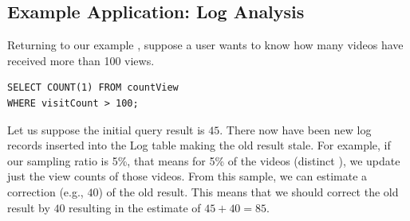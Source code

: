 \subsection{Example Application: Log Analysis}
Returning to our example , suppose a user wants to know how many videos have received more than 100 views.
\begin{lstlisting}[basicstyle={\scriptsize}]
SELECT COUNT(1) FROM countView 
WHERE visitCount > 100;
\end{lstlisting}
Let us suppose the initial query result is $45$.
There now have been new log records inserted into the Log table making the old result stale.
For example, if our sampling ratio is 5\%, that means for 5\% of the videos (distinct ), we update just the view counts of those videos.
From this sample, we can estimate a correction (e.g., $40$) of the old result.
This means that we should correct the old result by $40$ resulting in the estimate of $45+40 = 85$.
